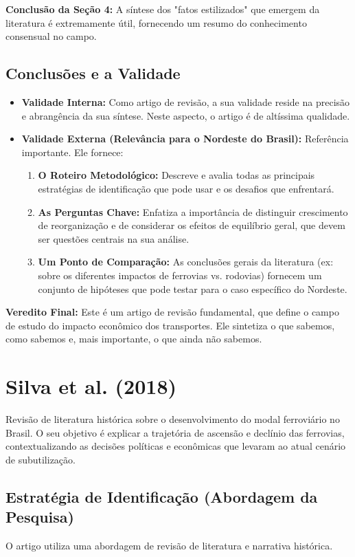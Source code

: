 \documentclass[12pt, a4paper]{article}
\begin{document}
\noindent\textbf{Conclusão da Seção 4:} A síntese dos "fatos estilizados" que emergem da literatura é extremamente útil, fornecendo um resumo do conhecimento consensual no campo.

\subsection{Conclusões e a Validade}
\begin{itemize}
    \item \textbf{Validade Interna:} Como artigo de revisão, a sua validade reside na precisão e abrangência da sua síntese. Neste aspecto, o artigo é de altíssima qualidade.
    \item \textbf{Validade Externa (Relevância para o Nordeste do Brasil):} Referência importante. Ele fornece:
        \begin{enumerate}
            \item \textbf{O Roteiro Metodológico:} Descreve e avalia todas as principais estratégias de identificação que pode usar e os desafios que enfrentará.
            \item \textbf{As Perguntas Chave:} Enfatiza a importância de distinguir crescimento de reorganização e de considerar os efeitos de equilíbrio geral, que devem ser questões centrais na sua análise.
            \item \textbf{Um Ponto de Comparação:} As conclusões gerais da literatura (ex: sobre os diferentes impactos de ferrovias vs. rodovias) fornecem um conjunto de hipóteses que pode testar para o caso específico do Nordeste.
        \end{enumerate}
\end{itemize}

\noindent\textbf{Veredito Final:} Este é um artigo de revisão fundamental, que define o campo de estudo do impacto econômico dos transportes. Ele sintetiza o que sabemos, como sabemos e, mais importante, o que ainda não sabemos. 

\section{Silva et al. (2018)}
Revisão de literatura histórica sobre o desenvolvimento do modal ferroviário no Brasil. O seu objetivo é explicar a trajetória de ascensão e declínio das ferrovias, contextualizando as decisões políticas e econômicas que levaram ao atual cenário de subutilização.

\subsection{Estratégia de Identificação (Abordagem da Pesquisa)}
O artigo utiliza uma abordagem de revisão de literatura e narrativa histórica.
\end{document}
